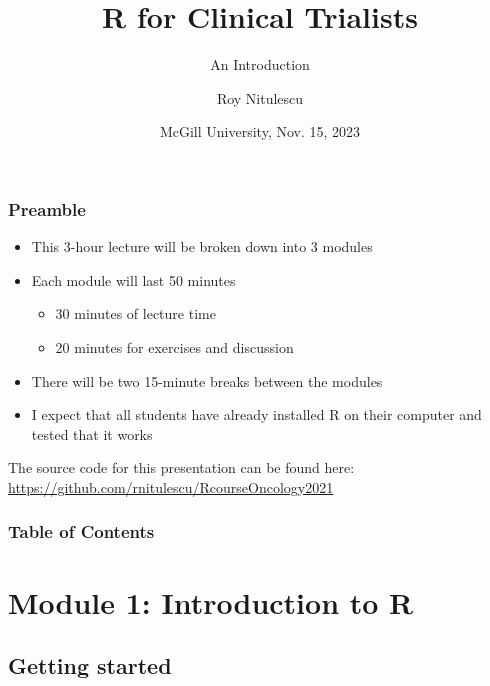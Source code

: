 \documentclass{beamer}
\title{R for Clinical Trialists}
\subtitle{An Introduction}
\author{Roy Nitulescu\inst{1}}
\institute
{
    \inst{1}%
    CITADEL\\
    CR-CHUM
}
\date[McGill, Nov. 15, 2023]{McGill University, Nov. 15, 2023}
\begin{document}

\frame{\titlepage}


\begin{frame}
    \frametitle{Preamble}
    \begin{itemize}
      \item This 3-hour lecture will be broken down into 3 modules
      \pause
      \item Each module will last 50 minutes
      \pause
      \begin{itemize}
        \item 30 minutes of lecture time
        \pause
        \item 20 minutes for exercises and discussion
        \pause
      \end{itemize}
      \item There will be two 15-minute breaks between the modules
      \pause
      \item I expect that all students have already installed R on their computer and tested that it works
    \end{itemize}
    
    \vfill
    
    \pause

    The source code for this presentation can be found here:\\
    \url{https://github.com/rnitulescu/RcourseOncology2021}
\end{frame}


\begin{frame}
    \frametitle{Table of Contents}
    \tableofcontents
\end{frame}



\section{Module 1: Introduction to R}

\subsection{Getting started}
\end{document}
